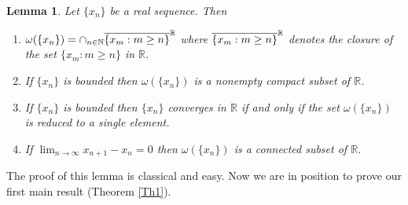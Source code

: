 \documentclass[11pt]{amsart}%
\theoremstyle{plain}
\numberwithin{equation}{section}
\newtheorem{lemma}{Lemma}[section]
\begin{document}
\begin{lemma}
\label{l1}
Let $\{x_{n}\}$ be a real sequence. Then

\begin{enumerate}
  \item $\omega (\{x_{n}\})=\cap _{n\in \mathbb{N}}\overline{%
\{x_{m}:m\geq n\}}^{\mathbb{R}}$ where $\overline{%
\{x_{m}:m\geq n\}}^{\mathbb{R}}$ denotes the closure of the set $\{x_{m}:m\geq n\}$ in $\mathbb{R}$.
\item If $\{x_{n}\}$ is bounded then $\omega (\{x_{n}\})$ is a nonempty compact
subset of $\mathbb{R}$.
\item If $\{x_{n}\}$ is bounded then $\{x_{n}\}$ converges in $\mathbb{R%
}$ if and only if the set $\omega (\{x_{n}\})$ is reduced to a single
element.
\item If $\lim_{n\rightarrow \infty }x_{n+1}-x_{n}=0$ then $\omega
(\{x_{n}\})$ is a connected subset of $\mathbb{R}$.
\end{enumerate}
\end{lemma}
The proof of this lemma is classical and easy.
Now we are in position to prove our first  main result (Theorem \ref{Th1}).
\end{document}
